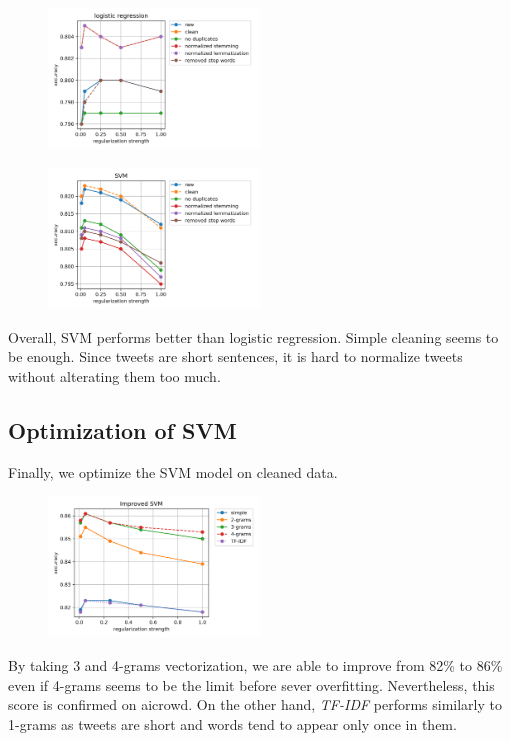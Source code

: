 \documentclass[11pt, a4paper, twocolumn]{article}
\begin{document}
\begin{figure}[h]
	\centering
	\includegraphics[width=0.5\textwidth]{../plots/logreg.png}
\end{figure}

\begin{figure}[h]
	\includegraphics[width=0.5\textwidth]{../plots/svm.png}
\end{figure}

Overall, SVM performs better than logistic regression. Simple cleaning seems to be enough. Since tweets are short sentences, it is hard to normalize tweets without alterating them too much.

\subsection{Optimization of SVM}
Finally, we optimize the SVM model on cleaned data.

\begin{figure}[h]
	\includegraphics[width=0.5\textwidth]{../plots/improved_svm.png}
\end{figure}

By taking 3 and 4-grams vectorization, we are able to improve from 82\% to 86\% even if 4-grams seems to be the limit before sever overfitting. Nevertheless, this score is confirmed on aicrowd. On the other hand, \textit{TF-IDF} performs similarly to 1-grams as tweets are short and words tend to appear only once in them.
\end{document}
